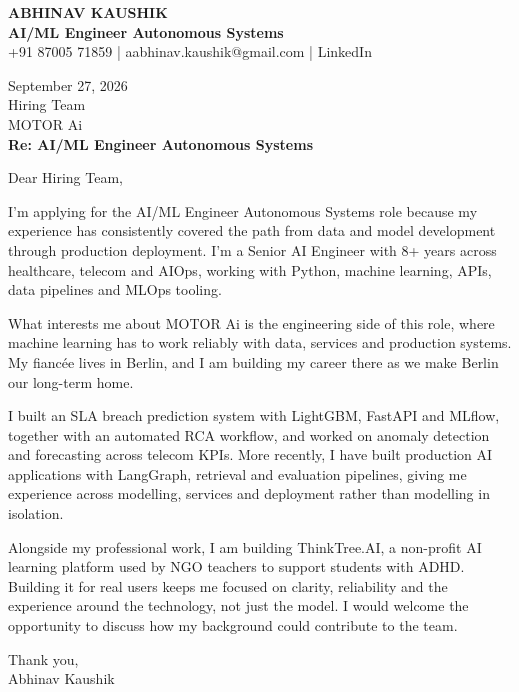 \documentclass[10pt,a4paper]{article}
\begin{document}
\begin{center}
{\Large\bfseries ABHINAV KAUSHIK}\\[2pt]
{\bfseries AI/ML Engineer Autonomous Systems}\\[2pt]
+91 87005 71859 \quad | \quad aabhinav.kaushik@gmail.com \quad | \quad LinkedIn
\end{center}
\vspace{8pt}
September 27, 2026\\[6pt]
Hiring Team\\
MOTOR Ai\\[4pt]
\textbf{Re: AI/ML Engineer Autonomous Systems}

Dear Hiring Team,

I’m applying for the AI/ML Engineer Autonomous Systems role because my experience has consistently covered the path from data and model development through production deployment. I’m a Senior AI Engineer with 8+ years across healthcare, telecom and AIOps, working with Python, machine learning, APIs, data pipelines and MLOps tooling.

What interests me about MOTOR Ai is the engineering side of this role, where machine learning has to work reliably with data, services and production systems. My fiancée lives in Berlin, and I am building my career there as we make Berlin our long-term home.

I built an SLA breach prediction system with LightGBM, FastAPI and MLflow, together with an automated RCA workflow, and worked on anomaly detection and forecasting across telecom KPIs. More recently, I have built production AI applications with LangGraph, retrieval and evaluation pipelines, giving me experience across modelling, services and deployment rather than modelling in isolation.

Alongside my professional work, I am building ThinkTree.AI, a non-profit AI learning platform used by NGO teachers to support students with ADHD. Building it for real users keeps me focused on clarity, reliability and the experience around the technology, not just the model. I would welcome the opportunity to discuss how my background could contribute to the team.

Thank you,\\
Abhinav Kaushik
\end{document}
